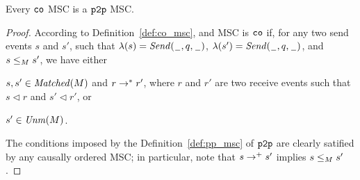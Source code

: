 \begin{proposition} \label{prop:co_is_pp}
	Every $\mathtt{co}$ MSC is a $\mathtt{p2p}$ MSC.
\end{proposition}
\begin{proof}
	According to Definition~\ref{def:co_msc}, and MSC is $\mathtt{co}$ if, for any two send events $s$ and $s'$, such that $\lambda(s)={\mathit{Send}(\hspace{0.1em}\underline{\hspace{0.5em}}\hspace{0.1em},q,\hspace{0.1em}\underline{\hspace{0.5em}}\hspace{0.1em})}$, $\lambda(s')={\mathit{Send}(\hspace{0.1em}\underline{\hspace{0.5em}}\hspace{0.1em},q,\hspace{0.1em}\underline{\hspace{0.5em}}\hspace{0.1em})}$, and $s \le_M s'$, we have either
	\begin{enumerate*}[label={(\roman*)}]
		\item $s,s' \in \mathit{Matched}(M)$ and $r \to^* r'$, where $r$ and $r'$ are two receive events such that $s \lhd r$ and $s' \lhd r'$, or
		\item $s' \in \mathit{Unm}(M)$.
	\end{enumerate*}
	The conditions imposed by the Definition~\ref{def:pp_msc} of $\mathtt{p2p}$ are clearly satified by any causally ordered MSC; in particular, note that $s \to^+ s'$ implies $s \le_M s'$.
\end{proof}

